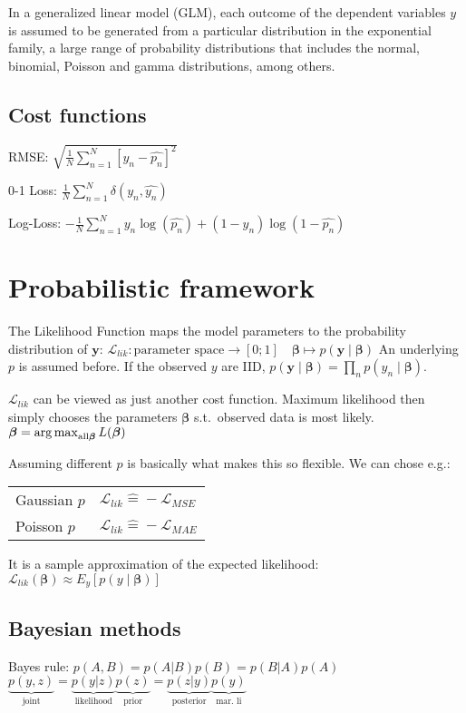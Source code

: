 \documentclass[10pt,a4paper,landscape]{article}
\renewcommand{\bf}[1]{\ensuremath{\mathbf{#1}}}
\newcommand{\bbeta}{\boldsymbol\beta}
\newcommand{\st}{s.t.}
\begin{document}
\begin{multicols*}{4}
In a generalized linear model (GLM), each outcome of the dependent variables $y$ is assumed to be generated from a particular distribution in the exponential family, a large range of probability distributions that includes the normal, binomial, Poisson and gamma distributions, among others.


\subsection{Cost functions}
RMSE: $\sqrt{\frac{1}{N} \sum_{n=1}^{N}\left[y_n- \hat{p_n} \right]^2}$

0-1 Loss: $ \frac{1}{N} \sum_{n=1}^{N} \delta(y_n, \hat{y_n})$

Log-Loss: $- \frac{1}{N}  \sum_{n=1}^{N} y_n \log(\hat{p_n}) + (1-y_n) \log(1-\hat{p_n})$

\section{Probabilistic framework}
The Likelihood Function maps the model parameters to the probability distribution of $\bf{y}$:
$\mathcal{L}_{lik}\colon \text{parameter space} \to [0;1]\quad  \bbeta \mapsto p(\bf{y} \mid  \bbeta)$
An underlying $p$ is assumed before. If the observed $y$ are IID, $p(\bf{y} \mid \bbeta) = \prod_n p(y_n \mid \bbeta)$.

$\mathcal{L}_{lik}$ can be viewed as just another cost function. Maximum likelihood then simply chooses the parameters $\bbeta$ \st\ observed data is most likely. $\bbeta = \argmax_{\text{all} \bbeta} L(\bbeta)$

Assuming different $p$ is basically what makes this so flexible. We can chose e.g.:

\begin{tabular}{ l  l }
  \hline
  Gaussian $p$ & $\mathcal{L}_{lik} \widehat{=} -\mathcal{L}_{MSE}$ \\
  Poisson $p$  & $\mathcal{L}_{lik} \widehat{=} -\mathcal{L}_{MAE}$ \\
  \hline
\end{tabular}

It is a sample approximation of the expected likelihood:
$\mathcal{L}_{lik}(\bbeta) \approx E_y[ p(y \mid \bbeta) ]$

\subsection{Bayesian methods}
Bayes rule: $p(A, B) = p(A|B) p(B) = p(B|A) p(A)$\\
$\underbrace{p(y,z)}_{\text{joint}} = \underbrace{p(y|z)}_{\text{likelihood}} \underbrace{p(z)}_{\text{prior}} = \underbrace{p(z|y)}_{\text{posterior}} \underbrace{p(y)}_{\text{mar. li}}$


\end{multicols*}
\end{document}
